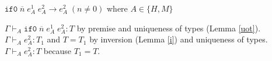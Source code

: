 \begin{case}
$\mathtt{if0}\;\overline{n}\;e_{A}^{1}\;e_{A}^{2}\rightarrow e_{A}^{2}\;(n\neq0)$ where $A\in\lbrace H,M\rbrace$

$\Gamma\vdash_{A}\mathtt{if0}\;\overline{n}\;e_{A}^{1}\;e_{A}^{2}:T$ by premise and uniqueness of types (Lemma \ref{uot}).  $\Gamma\vdash_{A}e_{A}^{2}:T_{1}$ and $T=T_{1}$ by inversion (Lemma \ref{i}) and uniqueness of types.  $\Gamma\vdash_{A}e_{A}^{2}:T$ because $T_{1}=T$.
\end{case}